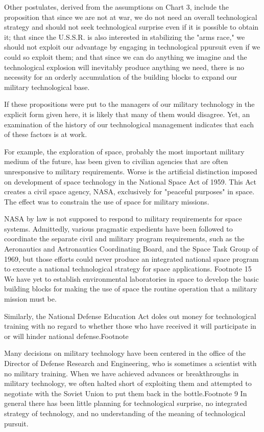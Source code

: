 \medskip

Other postulates, derived from the assumptions on Chart 3, include the proposition that since we are not at war, we do not need an overall technological strategy and should not seek technological surprise even if it is possible to obtain it; that since the U.S.S.R. is also interested in stabilizing the "arms race," we should not exploit our advantage by engaging in technological ppursuit even if we could so exploit them; and that since we can do anything we imagine and the technological explosion will inevitably produce anything we need, there is no necessity for an orderly accumulation of the building blocks to expand our military technological base.

If these propositions were put to the managers of our military technology in the explicit form given here, it is likely that many of them would disagree. Yet, an examination of the history of our technological management indicates that each of these factors is at work.

For example, the exploration of space, probably the most important military medium of the future, has been given to civilian agencies that are often unresponsive to military requirements. Worse is the artificial distinction imposed on development of space technology in the National Space Act of 1959. This Act creates a civil space agency, NASA, exclusively for "peaceful purposes" in space. The effect was to constrain the use of space for military missions.

NASA by law is not supposed to respond to military requirements for space systems. Admittedly, various pragmatic expedients have been followed to coordinate the separate civil and military program requirements, such as the Aeronautics and Astronautics Coordinating Board, and the Space Task Group of 1969, but those efforts could never produce an integrated national space program to execute a national technological strategy for space applications. Footnote 15 We have yet to establish environmental laboratories in space to develop the basic building blocks for making the use of space the routine operation that a military mission must be.

Similarly, the National Defense Education Act doles out money for technological training with no regard to whether those who have received it will participate in or will hinder national defense.Footnote 

Many decisions on military technology have been centered in the office of the Director of Defense Research and Engineering, who is sometimes a scientist with no military training. When we have achieved advances or breakthroughs in military technology, we often halted short of exploiting them and attempted to negotiate with the Soviet Union to put them back in the bottle.Footnote 9 In general there has been little planning for technological surprise, no integrated strategy of technology, and no understanding of the meaning of technological pursuit.

